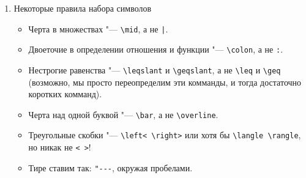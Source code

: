 \documentclass[12pt,a4paper]{book}
\begin{document}
\begin{enumerate}
\item Некоторые правила набора символов
\begin{itemize}
\item Черта в множествах "--- \verb'\mid', а не \verb'|'.
\item Двоеточие в определении отношения и функции "--- \verb'\colon', а не \verb':'.
\item Нестрогие равенства "--- \verb'\leqslant' и \verb'\geqslant', а не \verb'\leq' и \verb'\geq' (возможно, мы просто переопределим эти комманды, и тогда достаточно коротких комманд).
\item Черта над одной буквой "--- \verb'\bar', а не \verb'\overline'.
\item Треугольные скобки "--- \verb'\left< \right>' или хотя бы \verb'\langle \rangle', но никак не \verb'< >'!
\item Тире ставим так: \verb'"---', окружая пробелами.
\end{itemize}
\end{enumerate}
\end{document}
